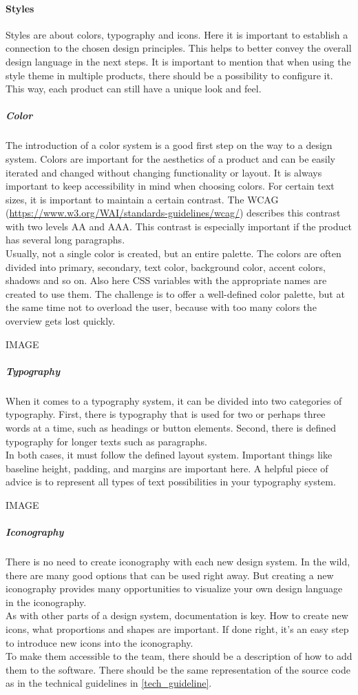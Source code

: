 \paragraph{Styles}
Styles are about colors, typography and icons. Here it is important to establish a connection to the chosen design principles. This helps to better convey the overall design language in the next steps. 
It is important to mention that when using the style theme in multiple products, there should be a possibility to configure it. This way, each product can still have a unique look and feel. \cite{vesselov_building_2019}
\subparagraph{Color}
The introduction of a color system is a good first step on the way to a design system. Colors are important for the aesthetics of a product and can be easily iterated and changed without changing functionality or layout. It is always important to keep accessibility in mind when choosing colors. For certain text sizes, it is important to maintain a certain contrast. The WCAG (\url{https://www.w3.org/WAI/standards-guidelines/wcag/}) describes this contrast with two levels AA and AAA. This contrast is especially important if the product has several long paragraphs.  \\
Usually, not a single color is created, but an entire palette. The colors are often divided into primary, secondary, text color, background color, accent colors, shadows and so on. Also here CSS variables with the appropriate names are created to use them. The challenge is to offer a well-defined color palette, but at the same time not to overload the user, because with too many colors the overview gets lost quickly. \cite{vesselov_building_2019}


IMAGE 


\subparagraph{Typography}
When it comes to a typography system, it can be divided into two categories of typography. First, there is typography that is used for two or perhaps three words at a time, such as headings or button elements. Second, there is defined typography for longer texts such as paragraphs. \\
In both cases, it must follow the defined layout system. Important things like baseline height, padding, and margins are important here. A helpful piece of advice is to represent all types of text possibilities in your typography system.  \cite{vesselov_building_2019}


IMAGE

\subparagraph{Iconography}
There is no need to create iconography with each new design system. In the wild, there are many good options that can be used right away. But creating a new iconography provides many opportunities to visualize your own design language in the iconography.
\\
As with other parts of a design system, documentation is key. How to create new icons, what proportions and shapes are important. If done right, it's an easy step to introduce new icons into the iconography. 
\\
To make them accessible to the team, there should be a description of how to add them to the software. There should be the same representation of the source code as in the technical guidelines in \ref{tech_guideline}. \cite{vesselov_building_2019}


